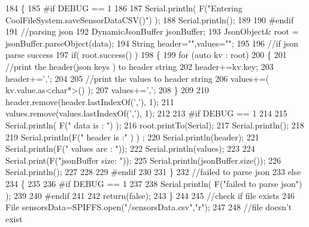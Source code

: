 \begin{DoxyCode}
184 \{
185 \textcolor{preprocessor}{#if DEBUG == 1}
186 
187     Serial.println( F(\textcolor{stringliteral}{"Entering CoolFileSystem.saveSensorDataCSV()"}) );
188     Serial.println();
189 
190 \textcolor{preprocessor}{#endif}
191     \textcolor{comment}{//parsing json}
192     DynamicJsonBuffer jsonBuffer;
193     JsonObject& root = jsonBuffer.parseObject(data);
194     String header=\textcolor{stringliteral}{""},values=\textcolor{stringliteral}{""};
195     
196     \textcolor{comment}{//if json parse success}
197     \textcolor{keywordflow}{if}( root.success() )
198     \{       
199         \textcolor{keywordflow}{for} (\textcolor{keyword}{auto} kv : root) 
200         \{
201             \textcolor{comment}{//print the header(json keys ) to header string}
202             header+=kv.key;
203             header+=\textcolor{charliteral}{','};
204             
205             \textcolor{comment}{//print the values to header string}
206             values+=( kv.value.as<\textcolor{keywordtype}{char}*>() );
207             values+=\textcolor{charliteral}{','};
208         \}
209 
210         header.remove(header.lastIndexOf(\textcolor{charliteral}{','}), 1);
211         values.remove(values.lastIndexOf(\textcolor{charliteral}{','}), 1);      
212     
213 \textcolor{preprocessor}{    #if DEBUG == 1}
214     
215         Serial.println( F(\textcolor{stringliteral}{" data is : "}) );
216         root.printTo(Serial);
217         Serial.println();
218         
219         Serial.println(F(\textcolor{stringliteral}{" header is :"} ) ) ;
220         Serial.println(header);
221         Serial.println(F(\textcolor{stringliteral}{" values are : "}));
222         Serial.println(values);
223         
224         Serial.print(F(\textcolor{stringliteral}{"jsonBuffer size: "}));
225         Serial.println(jsonBuffer.size());
226         Serial.println();
227 
228     
229 \textcolor{preprocessor}{    #endif}
230     
231     \}
232     \textcolor{comment}{//failed to parse json}
233     \textcolor{keywordflow}{else}
234     \{
235     
236 \textcolor{preprocessor}{    #if DEBUG == 1}
237 
238         Serial.println( F(\textcolor{stringliteral}{"failed to parse json"}) );
239     
240 \textcolor{preprocessor}{    #endif}
241 
242         \textcolor{keywordflow}{return}(\textcolor{keyword}{false});
243     \}
244 
245     \textcolor{comment}{//check if file exists}
246     File sensorsData=SPIFFS.open(\textcolor{stringliteral}{"/sensorsData.csv"},\textcolor{stringliteral}{"r"});
247     
248     \textcolor{comment}{//file doesn't exist}

\end{DoxyCode}
